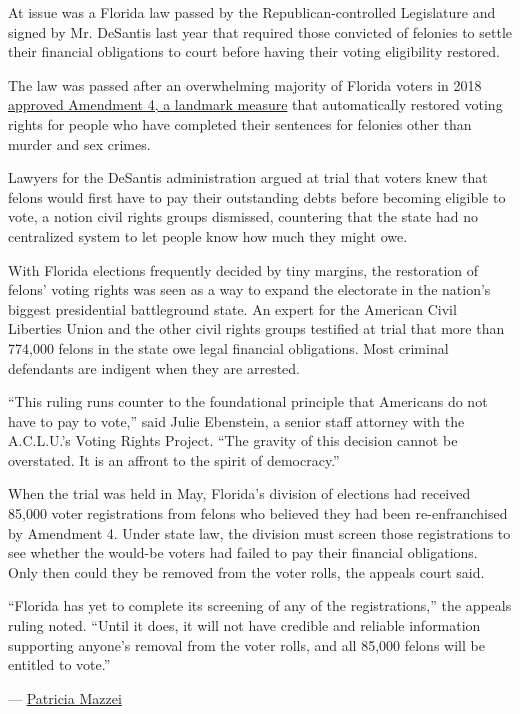 At issue was a Florida law passed by the Republican-controlled
Legislature and signed by Mr. DeSantis last year that required those
convicted of felonies to settle their financial obligations to court
before having their voting eligibility restored.

The law was passed after an overwhelming majority of Florida voters in
2018
\href{https://www.nytimes3xbfgragh.onion/2018/11/07/us/florida-felon-voting-rights.html}{approved
Amendment 4, a landmark measure} that automatically restored voting
rights for people who have completed their sentences for felonies other
than murder and sex crimes.

Lawyers for the DeSantis administration argued at trial that voters knew
that felons would first have to pay their outstanding debts before
becoming eligible to vote, a notion civil rights groups dismissed,
countering that the state had no centralized system to let people know
how much they might owe.

With Florida elections frequently decided by tiny margins, the
restoration of felons' voting rights was seen as a way to expand the
electorate in the nation's biggest presidential battleground state. An
expert for the American Civil Liberties Union and the other civil rights
groups testified at trial that more than 774,000 felons in the state owe
legal financial obligations. Most criminal defendants are indigent when
they are arrested.

``This ruling runs counter to the foundational principle that Americans
do not have to pay to vote,'' said Julie Ebenstein, a senior staff
attorney with the A.C.L.U.'s Voting Rights Project. ``The gravity of
this decision cannot be overstated. It is an affront to the spirit of
democracy.''

When the trial was held in May, Florida's division of elections had
received 85,000 voter registrations from felons who believed they had
been re-enfranchised by Amendment 4. Under state law, the division must
screen those registrations to see whether the would-be voters had failed
to pay their financial obligations. Only then could they be removed from
the voter rolls, the appeals court said.

``Florida has yet to complete its screening of any of the
registrations,'' the appeals ruling noted. ``Until it does, it will not
have credible and reliable information supporting anyone's removal from
the voter rolls, and all 85,000 felons will be entitled to vote.''

---
\href{https://www.nytimes3xbfgragh.onion/by/patricia-mazzei}{Patricia
Mazzei}


